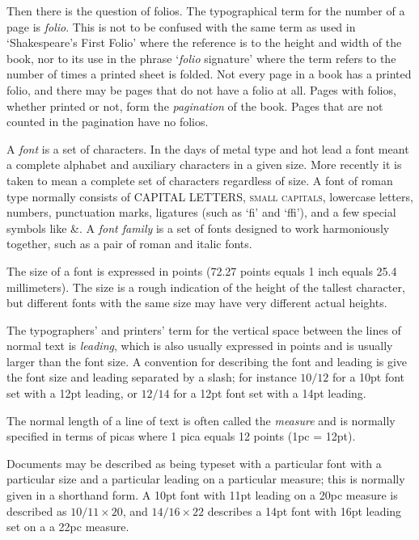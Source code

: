 \documentclass[10pt,letterpaper]{memoir}
\begin{document}
   Then there is the question of folios. The typographical term for
the number of a page is \emph{folio}.
This is not to be confused with
the same term as used in `Shakespeare's First Folio' where the reference is
to the height and width of the book, nor to its use in the phrase
`\emph{folio} signature' where the term refers to the 
number of times a printed sheet is folded. 
Not every page in a book has a printed
folio, and there may be pages that do not have a folio at all. Pages with
folios, whether printed or not, form the \emph{pagination} 
of the book. Pages
that are not counted in the pagination have no folios.

   A \emph{font} is a set of characters. In the days of 
metal type and hot lead a font meant a complete alphabet and auxiliary
characters in a given size. More recently it is taken to mean a complete
set of characters regardless of size. A font of roman type normally
consists of CAPITAL LETTERS, \textsc{small capitals}, lowercase letters,
numbers, punctuation marks, ligatures (such as `fi' and `ffi'), and a
few special symbols like \&.
   A \emph{font family} is a set of fonts designed to
work harmoniously together, such as a pair of roman and italic fonts.

   The size of a font is expressed in points 
(72.27 points equals 1 inch
equals 25.4 millimeters). The size is a rough indication of the height
of the tallest character, but different fonts with the same size may have
very different actual heights.

    The typographers' and printers' term for the vertical space between
the lines of normal text is \emph{leading}, which is also
usually expressed in points and is usually larger than the font size.
A convention for describing the font and leading is give the font size 
and leading separated by a slash; for instance $10/12$ for a
10pt font set with a 12pt leading, or $12/14$ for a 12pt font set with a
14pt leading.

    The normal length of a line of text is often called the 
\emph{measure} and is normally specified in terms of
picas where 1 pica equals 12 points (1pc = 12pt).

    Documents may be described as being typeset with a particular font
with a particular size and a particular leading on a particular measure;
this is normally given in a shorthand form. 
A 10pt font with 11pt leading on a 20pc measure is described as
$10/11 \times 20$, and $14/16 \times 22$ describes a 14pt font
with 16pt leading set on a a 22pc measure.
\end{document}
